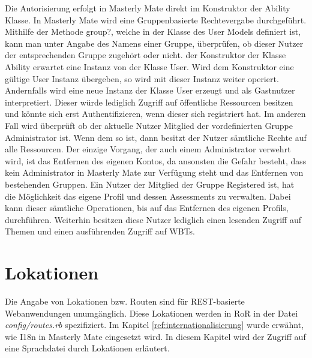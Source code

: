 Die Autorisierung erfolgt in Masterly Mate direkt im
Konstruktor der Ability Klasse. In Masterly Mate wird eine Gruppenbasierte
Rechtevergabe durchgeführt. Mithilfe der Methode group?, welche in der Klasse
des User Models definiert ist, kann man unter Angabe des Namens einer Gruppe,
überprüfen, ob dieser Nutzer der entsprechenden Gruppe zugehört oder nicht.
der Konstruktor der Klasse Ability erwartet eine Instanz von der Klasse
User. Wird dem Konstruktor eine gültige User Instanz übergeben, so wird
mit dieser Instanz weiter operiert. Andernfalls wird eine neue Instanz der
Klasse User erzeugt und als Gastnutzer interpretiert. Dieser würde lediglich
Zugriff auf öffentliche Ressourcen besitzen und könnte sich erst
Authentifizieren, wenn dieser sich registriert hat. Im anderen Fall wird
überprüft ob der aktuelle Nutzer Mitglied der vordefinierten Gruppe
Administrator ist. Wenn dem so ist, dann besitzt der Nutzer sämtliche Rechte auf
alle Ressourcen. Der einzige Vorgang, der auch einem Administrator verwehrt
wird, ist das Entfernen des eigenen Kontos, da ansonsten die Gefahr
besteht, dass kein Administrator in Masterly Mate zur Verfügung steht und das
Entfernen von bestehenden Gruppen. Ein Nutzer der Mitglied der Gruppe Registered
ist, hat die Möglichkeit das eigene Profil und dessen Assessments zu verwalten.
Dabei kann dieser sämtliche Operationen, bis auf das Entfernen des eigenen Profils,
durchführen. Weiterhin besitzen diese Nutzer lediglich einen lesenden Zugriff
auf Themen und einen ausführenden Zugriff auf WBTs. 

\section{Lokationen}
Die Angabe von Lokationen bzw. Routen sind für REST-basierte Webanwendungen
unumgänglich. Diese Lokationen werden in RoR in der Datei 
\textit{config/routes.rb} spezifiziert. Im Kapitel
\ref{ref:internationalisierung} wurde erwähnt, wie I18n in Masterly Mate eingesetzt wird. In diesem Kapitel wird der
Zugriff auf eine Sprachdatei durch Lokationen erläutert. 

